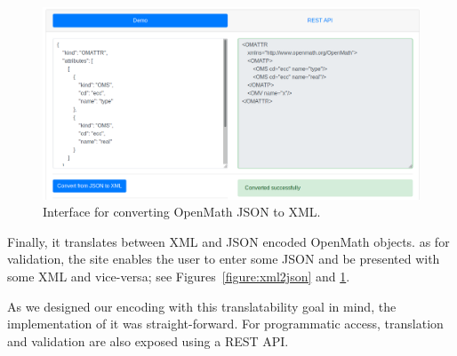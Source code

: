 \begin{figure}\centering
  \includegraphics[width=\textwidth]{images/json2xml}
  \caption{Interface for converting OpenMath JSON to XML.}\label{figure:json2xml}
\end{figure}

Finally, it translates between XML and JSON encoded OpenMath objects. as for validation,
the site enables the user to enter some JSON and be presented with some XML and
vice-versa; see Figures~\ref{figure:xml2json} and \ref{figure:json2xml}.

As we designed our encoding with this translatability goal in mind, the implementation of
it was straight-forward.  For programmatic access, translation and validation are also
exposed using a REST API.



